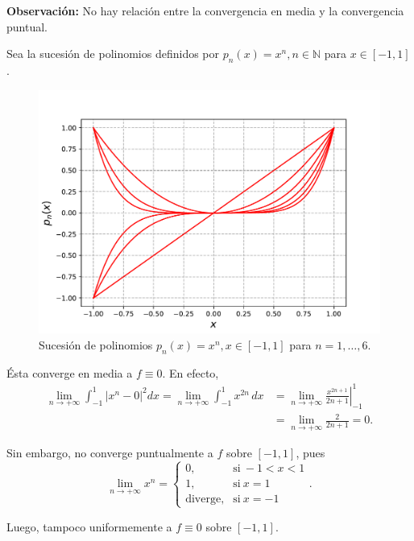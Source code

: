 \textbf{Observación:} No hay relación entre la convergencia en media y la convergencia puntual.

\begin{ejemplo}
Sea la sucesión de polinomios definidos por $p_n(x) = x^n, n \in \mathbb{N}$ para $x \in [-1,1]$.

\begin{figure}[H]
    \centering
    \includegraphics[scale = 0.57]{Figuras/SucesionPolinomios.pdf}
    \caption{Sucesión de polinomios $p_n(x) = x^n, x \in [-1,1]$ para $n = 1, \dots, 6$.}
\end{figure}

Ésta converge en media a $f \equiv 0$. En efecto, 
\begin{align*}
\lim_{n \to + \infty} \int_{-1}^1 |x^n - 0|^2 dx  = \lim_{n \to + \infty }  \int_{-1}^1 x^{2n} \,dx &= \lim_{n \to + \infty} \left. \frac{x^{2n+1}}{2n+1} \right|_{-1}^1 \\
&=  \lim_{n \to + \infty} \frac{2}{2n+1} = 0.
\end{align*}

Sin embargo, no converge puntualmente a $f$ sobre $[-1,1]$, pues 
$$\lim_{n \to + \infty} x^n = \left\{ \begin{array}{cl}
   0 ,& \mbox{si}~ -1 < x < 1 \\
   1  ,&  \mbox{si}~ x = 1 \\
   \mbox{diverge},&  \mbox{si}~ x = -1
\end{array}  \right. .$$

Luego, tampoco uniformemente a $f \equiv 0$ sobre $[-1,1]$.
\end{ejemplo}

